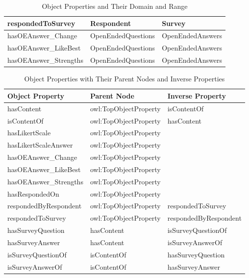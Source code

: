 \begin{doublespace}
\begin{table}[h!]
\begin{tabular}{|l|l|l|}
     respondedToSurvey & Respondent & Survey\\ \hline
     hasOEAnswer\_Change & OpenEndedQuestions & OpenEndedAnswers\\ \hline
     hasOEAnswer\_LikeBest & OpenEndedQuestions & OpenEndedAnswers\\ \hline
     hasOEAnswer\_Strengths & OpenEndedQuestions & OpenEndedAnswers\\ \hline
    \end{tabular}
    \caption{Object Properties and Their Domain and Range}
    \label{table:4.2}
    \end{table}
\begin{table}[h!]
    \centering
    \begin{tabular}{|l|l|l|} 
    \hline Object Property & Parent Node & Inverse Property\\ \hline
     hasContent & owl:TopObjectProperty & isContentOf\\ \hline
     isContentOf & owl:TopObjectProperty & hasContent\\ \hline
     hasLikertScale & owl:TopObjectProperty & \\ \hline
     hasLikertScaleAnswer & owl:TopObjectProperty & \\ \hline
     hasOEAnswer\_Change & owl:TopObjectProperty & \\ \hline
     hasOEAnswer\_LikeBest & owl:TopObjectProperty & \\ \hline
     hasOEAnswer\_Strengths & owl:TopObjectProperty & \\ \hline
     hasRespondedOn & owl:TopObjectProperty & \\ \hline
     respondedByRespondent & owl:TopObjectProperty & respondedToSurvey\\ \hline
     respondedToSurvey & owl:TopObjectProperty & respondedByRespondent\\ \hline
     hasSurveyQuestion & hasContent & isSurveyQuestionOf\\ \hline
     hasSurveyAnswer & hasContent & isSurveyAnswerOf\\ \hline
     isSurveyQuestionOf & isContentOf & hasSurveyQuestion\\ \hline
     isSurveyAnswerOf & isContentOf & hasSurveyAnswer\\ \hline
    \end{tabular}
    \caption{Object Properties with Their Parent Nodes and Inverse Properties}
    \label{table:4.3}
    \end{table}

\end{doublespace}

